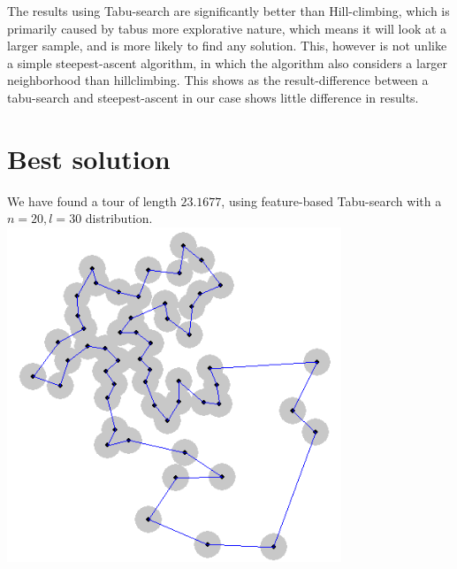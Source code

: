 \documentclass{article}
\begin{document}
The results using Tabu-search are significantly better than Hill-climbing, which is primarily caused by
tabus more explorative nature, which means it will look at a larger sample, and is more likely to find
any solution. This, however is not unlike a simple steepest-ascent algorithm, in which the algorithm
also considers a larger neighborhood than hillclimbing. This shows as the result-difference between a
tabu-search and steepest-ascent in our case shows little difference in results.

\section{Best solution}
We have found a tour of length $23.1677$, using feature-based Tabu-search with a $n=20,l=30$ distribution.\\
\includegraphics[width=100mm]{solution-2316.png}
\end{document}
